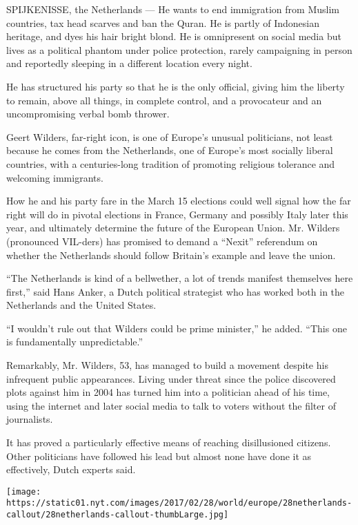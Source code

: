 SPIJKENISSE, the Netherlands --- He wants to end immigration from Muslim
countries, tax head scarves and ban the Quran. He is partly of
Indonesian heritage, and dyes his hair bright blond. He is omnipresent
on social media but lives as a political phantom under police
protection, rarely campaigning in person and reportedly sleeping in a
different location every night.

He has structured his party so that he is the only official, giving him
the liberty to remain, above all things, in complete control, and a
provocateur and an uncompromising verbal bomb thrower.

Geert Wilders, far-right icon, is one of Europe's unusual politicians,
not least because he comes from the Netherlands, one of Europe's most
socially liberal countries, with a centuries-long tradition of promoting
religious tolerance and welcoming immigrants.

How he and his party fare in the March 15 elections could well signal
how the far right will do in pivotal elections in France, Germany and
possibly Italy later this year, and ultimately determine the future of
the European Union. Mr. Wilders (pronounced VIL-ders) has promised to
demand a ``Nexit'' referendum on whether the Netherlands should follow
Britain's example and leave the union.

``The Netherlands is kind of a bellwether, a lot of trends manifest
themselves here first,'' said Hans Anker, a Dutch political strategist
who has worked both in the Netherlands and the United States.

``I wouldn't rule out that Wilders could be prime minister,'' he added.
``This one is fundamentally unpredictable.''

Remarkably, Mr. Wilders, 53, has managed to build a movement despite his
infrequent public appearances. Living under threat since the police
discovered plots against him in 2004 has turned him into a politician
ahead of his time, using the internet and later social media to talk to
voters without the filter of journalists.

It has proved a particularly effective means of reaching disillusioned
citizens. Other politicians have followed his lead but almost none have
done it as effectively, Dutch experts said.

\href{https://www.nytimes.com/interactive/2017/02/28/world/europe/netherlands-immigration-election.html}{}

\texttt{[image: https://static01.nyt.com/images/2017/02/28/world/europe/28netherlands-callout/28netherlands-callout-thumbLarge.jpg]}

